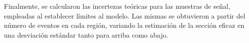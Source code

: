 Finalmente, se calcularon las incertezas teóricas para las muestras de señal, empleadas al establecer límites al modelo. Las mismas se obtuvieron a partir del número de eventos en cada región, variando la estimación de la sección eficaz en una desviación estándar tanto para arriba como abajo.








